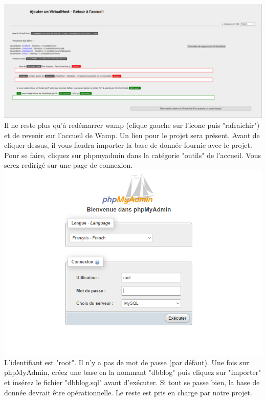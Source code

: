 \documentclass{article}
\begin{document}
    \includegraphics[width=\textwidth]{images/virtualhost.PNG}\\
    
    Il ne reste plus qu'à redémarrer 
    wamp (clique gauche sur l'icone puis "rafraichir") et de revenir sur l'accueil de Wamp. Un lien pour le projet sera présent.
    Avant de cliquer dessus, il vous faudra importer la base de donnée fournie avec le projet. Pour se faire, cliquez sur phpmyadmin
    dans la catégorie "outils" de l'accueil. Vous serez redirigé sur une page de connexion.\\


    \includegraphics[width=\textwidth]{images/myadmin.PNG}\\

    L'identifiant est "root". Il n'y a pas de mot de passe (par défaut). Une fois sur phpMyAdmin, créez une base en la nommant "dbblog" puis cliquez sur "importer" et insérez le
    fichier "dbblog.sql" avant d'exécuter. Si tout se passe bien, la base de donnée devrait être opérationnelle. Le reste est pris en
    charge par notre projet.\\
\end{document}
